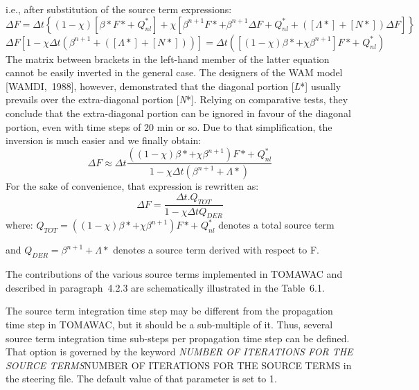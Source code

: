 i.e., after substitution of the source term expressions:
\begin{equation} \label{GrindEQ__6_19_}
\Delta F=\Delta t\left\{\left(1-\chi \right)\left[\beta *F*+\; Q_{nl}^{*} \right]+\chi \left[\beta ^{n+1} F*+\beta ^{n+1} \Delta F+Q_{nl}^{*} +\left(\left[\Lambda *\right]+\left[N*\right]\right)\Delta F\right]\right\}
\end{equation}
\begin{equation} \label{GrindEQ__6_20_}
\Delta F\left[1-\chi \Delta t\left(\beta ^{n+1} +\left(\left[\Lambda *\right]+\left[N*\right]\right)\right)\right]=\Delta t\left(\left[(1-\chi )\beta *+\chi \beta ^{n+1} \right]F*+\; Q_{nl}^{*} \right)
\end{equation}
The matrix between brackets in the left-hand member of the latter equation cannot be easily inverted in the general case. The designers of the WAM model [WAMDI,~1988], however, demonstrated that the diagonal portion [\textit{L}*] usually prevails over the extra-diagonal portion [\textit{N}*]. Relying on comparative tests, they conclude that the extra-diagonal portion can be ignored in favour of the diagonal portion, even with time steps of 20 min or so. Due to that simplification, the inversion is much easier and we finally obtain:
\begin{equation} \label{GrindEQ__6_21_}
\Delta F\approx \Delta t\frac{\left((1-\chi )\beta *+\chi \beta ^{n+1} \right)F*+\; Q_{nl}^{*} }{1-\chi \Delta t\left(\beta ^{n+1} +\Lambda *\right)}
\end{equation}
For the sake of convenience, that expression is rewritten as:
\begin{equation} \label{GrindEQ__6_22_}
\Delta F=\frac{\Delta t.Q_{TOT} }{1-\chi \Delta tQ_{DER} }
\end{equation}
where: $Q_{TOT} =\left((1-\chi )\beta *+\chi \beta ^{n+1} \right)F*+\; Q_{nl}^{*} $ denotes a total source term

 and $Q_{DER} =\beta ^{n+1} +\Lambda *$   denotes a source term derived with respect to F.



 The contributions of the various source terms implemented in TOMAWAC and described in paragraph~4.2.3 are schematically illustrated in the Table~6.1.

 The source term integration time step may be different from the propagation time step in TOMAWAC, but it should be a sub-multiple of it. Thus, several source term integration time sub-steps per propagation time step can be defined. That option is governed by the keyword \textit{NUMBER OF ITERATIONS FOR THE SOURCE TERMS}NUMBER OF ITERATIONS FOR THE SOURCE TERMS\textit{ }in the steering file. The default value of that parameter is set to 1.

